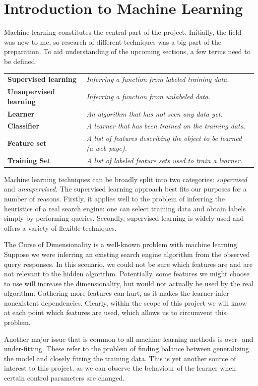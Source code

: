 \documentclass[12pt,notitlepage,twoside]{scrbook}
\begin{document}
\section{Introduction to Machine Learning}

Machine learning constitutes the central part of the project. Initially, the field was new
to me, so research of different techniques was a big part of the preparation.
To aid understanding of the upcoming sections, a few terms need to be defined:

\begin{tabular}{l l}
	\bf Supervised learning & \it Inferring a function from labeled training data. \\
	\bf Unsupervised learning & \it Inferring a function from unlabeled data.\\
	\bf Learner & \it An algorithm that has not seen any data yet.\\
	\bf Classifier & \it A learner that has been trained on the training data.\\
	\bf Feature set & \it A list of features describing the object to be learned (a web
	page).\\
	\bf Training Set & \it A list of labeled feature sets used to train a learner.\\
\end{tabular}

Machine learning techniques can be broadly split into two categories: \textit{supervised}
and \textit{unsupervised}. The supervised learning approach best fits our purposes for a
number of reasons. Firstly, it applies well to the problem of inferring the heuristics of
a real search engine: one can select training data and obtain labels simply by performing
queries. Secondly, supervised learning is widely used and offers a variety of flexible
techniques.

The Curse of Dimensionality is a well-known problem with machine learning. Suppose we were
inferring an existing search engine algorithm from the observed query responses. In this
scenario, we could not be sure which features are and are not relevant to the hidden
algorithm. Potentially, some features we might choose to use will increase the
dimensionality, but would not actually be used by the real algorithm. Gathering more
features can hurt, as it makes the learner infer nonexistent dependencies. Clearly, within
the scope of this project we will know at each point which features are used, which allows
us to circumvent this problem.

Another major issue that is common to all machine learning methods is over- and
under-fitting. These refer to the problem of finding balance between generalizing the
model and closely fitting the training data. This is yet another source of interest to
this project, as we can observe the behaviour of the learner when certain control
parameters are changed.
\end{document}
